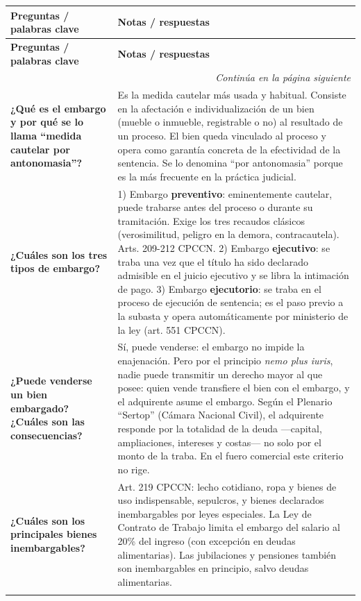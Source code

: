 \documentclass[12pt,oneside]{book}
\begin{document}
\begin{longtable}{p{} p{}}
\toprule
\textbf{Preguntas / palabras clave} & \textbf{Notas / respuestas} \\
\midrule
\endfirsthead

\toprule
\textbf{Preguntas / palabras clave} & \textbf{Notas / respuestas} \\
\midrule
\endhead

\midrule
\multicolumn{2}{r}{\textit{Continúa en la página siguiente}} \\
\endfoot

\bottomrule
\endlastfoot

\textbf{¿Qué es el embargo y por qué se lo llama ``medida cautelar por antonomasia''?} &
Es la medida cautelar más usada y habitual. Consiste en la afectación e individualización de un bien (mueble o inmueble, registrable o no) al resultado de un proceso. El bien queda vinculado al proceso y opera como garantía concreta de la efectividad de la sentencia. Se lo denomina ``por antonomasia'' porque es la más frecuente en la práctica judicial. \\
\addlinespace

\textbf{¿Cuáles son los tres tipos de embargo?} &
1) Embargo \textbf{preventivo}: eminentemente cautelar, puede trabarse antes del proceso o durante su tramitación. Exige los tres recaudos clásicos (verosimilitud, peligro en la demora, contracautela). Arts. 209-212 CPCCN. 2) Embargo \textbf{ejecutivo}: se traba una vez que el título ha sido declarado admisible en el juicio ejecutivo y se libra la intimación de pago. 3) Embargo \textbf{ejecutorio}: se traba en el proceso de ejecución de sentencia; es el paso previo a la subasta y opera automáticamente por ministerio de la ley (art. 551 CPCCN). \\
\addlinespace

\textbf{¿Puede venderse un bien embargado? ¿Cuáles son las consecuencias?} &
Sí, puede venderse: el embargo no impide la enajenación. Pero por el principio \textit{nemo plus iuris}, nadie puede transmitir un derecho mayor al que posee: quien vende transfiere el bien con el embargo, y el adquirente asume el embargo. Según el Plenario ``Sertop'' (Cámara Nacional Civil), el adquirente responde por la totalidad de la deuda ---capital, ampliaciones, intereses y costas--- no solo por el monto de la traba. En el fuero comercial este criterio no rige. \\
\addlinespace

\textbf{¿Cuáles son los principales bienes inembargables?} &
Art. 219 CPCCN: lecho cotidiano, ropa y bienes de uso indispensable, sepulcros, y bienes declarados inembargables por leyes especiales. La Ley de Contrato de Trabajo limita el embargo del salario al 20\% del ingreso (con excepción en deudas alimentarias). Las jubilaciones y pensiones también son inembargables en principio, salvo deudas alimentarias. \\
\addlinespace


\end{longtable}
\end{document}
